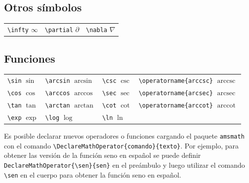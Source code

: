 \documentclass[
  spanish,
  a4paper,
]{scrreport}
\newcounter{none} %
\theoremstyle{definition}
\theoremstyle{remark}
\begin{document}
\subsection{Otros símbolos}\label{otros-suxedmbolos}

{\def\LTcaptype{none} %
\begin{longtable}[]{@{}lll@{}}
\toprule\noalign{}
\endhead
\bottomrule\noalign{}
\endlastfoot
\texttt{\textbackslash{}infty} \(\infty\) &
\texttt{\textbackslash{}partial} \(\partial\) &
\texttt{\textbackslash{}nabla} \(\nabla\) \\
\end{longtable}
}

\subsection{Funciones}\label{funciones}

{\def\LTcaptype{none} %
\begin{longtable}[]{@{}
  >{\raggedright\arraybackslash}p{}
  >{\raggedright\arraybackslash}p{}
  >{\raggedright\arraybackslash}p{}
  >{\raggedright\arraybackslash}p{}@{}}
\toprule\noalign{}
\endhead
\bottomrule\noalign{}
\endlastfoot
\texttt{\textbackslash{}sin} \(\sin\) & \texttt{\textbackslash{}arcsin}
\(\arcsin\) & \texttt{\textbackslash{}csc} \(\csc\) &
\texttt{\textbackslash{}operatorname\{arccsc\}}
\(\operatorname{arccsc}\) \\
\texttt{\textbackslash{}cos} \(\cos\) & \texttt{\textbackslash{}arccos}
\(\arccos\) & \texttt{\textbackslash{}sec} \(\sec\) &
\texttt{\textbackslash{}operatorname\{arcsec\}}
\(\operatorname{arcsec}\) \\
\texttt{\textbackslash{}tan} \(\tan\) & \texttt{\textbackslash{}arctan}
\(\arctan\) & \texttt{\textbackslash{}cot} \(\cot\) &
\texttt{\textbackslash{}operatorname\{arccot\}}
\(\operatorname{arccot}\) \\
\texttt{\textbackslash{}exp} \(\exp\) & \texttt{\textbackslash{}log}
\(\log\) & \texttt{\textbackslash{}ln} \(\ln\) & \\
\end{longtable}
}

Es posible declarar nuevos operadores o funciones cargando el paquete
\texttt{amsmath} con el comando
\texttt{\textbackslash{}DeclareMathOperator\{comando\}\{texto\}}. Por
ejemplo, para obtener las versión de la función seno en español se puede
definir \texttt{DeclareMathOperator\{\textbackslash{}sen\}\{sen\}} en el
preámbulo y luego utilizar el comando \texttt{\textbackslash{}sen} en el
cuerpo para obtener la función seno en español.
\end{document}
